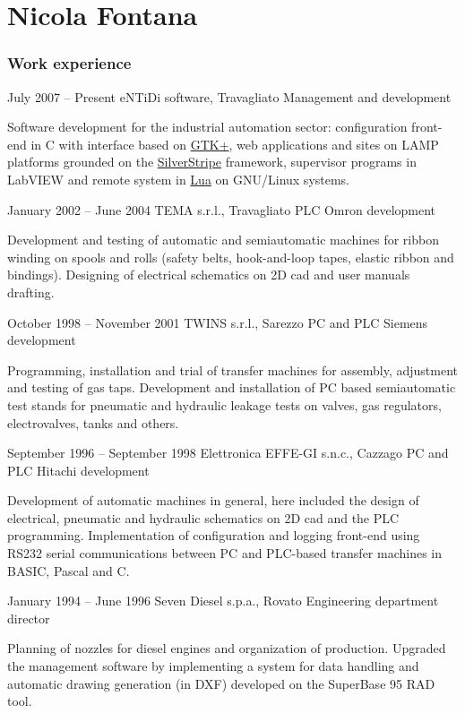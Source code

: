 \documentclass{tccv}
\begin{document}
\part{Nicola Fontana}

\section{Work experience}

\begin{eventlist}

\item{July 2007 -- Present}
     {eNTiDi software, Travagliato}
     {Management and development}

Software development for the industrial automation sector: configuration
front-end in C with interface based on \href{http://www.gtk.org/}{GTK+},
web applications and sites on LAMP platforms grounded on the
\href{http://www.silverstripe.org/}{SilverStripe} framework,
supervisor programs in LabVIEW and remote system in
\href{http://www.lua.org/}{Lua} on GNU/Linux systems.

\item{January 2002 -- June 2004}
     {TEMA s.r.l., Travagliato}
     {PLC Omron development}

Development and testing of automatic and semiautomatic machines for
ribbon winding on spools and rolls (safety belts, hook-and-loop tapes,
elastic ribbon and bindings). Designing of electrical schematics on
2D cad and user manuals drafting.

\item{October 1998 -- November 2001}
     {TWINS s.r.l., Sarezzo}
     {PC and PLC Siemens development}

Programming, installation and trial of transfer machines for assembly,
adjustment and testing of gas taps. Development and installation of PC
based semiautomatic test stands for pneumatic and hydraulic leakage
tests on valves, gas regulators, electrovalves, tanks and others.

\item{September 1996 -- September 1998}
     {Elettronica EFFE-GI s.n.c., Cazzago}
     {PC and PLC Hitachi development}

Development of automatic machines in general, here included the design
of electrical, pneumatic and hydraulic schematics on 2D cad and the PLC
programming. Implementation of configuration and logging front-end using
RS232 serial communications between PC and PLC-based transfer machines
in BASIC, Pascal and C.

\item{January 1994 -- June 1996}
     {Seven Diesel s.p.a., Rovato}
     {Engineering department director}

Planning of nozzles for diesel engines and organization of production.
Upgraded the management software by implementing a system for data
handling and automatic drawing generation (in DXF) developed on the
SuperBase 95 RAD tool.

\end{eventlist}
\end{document}
